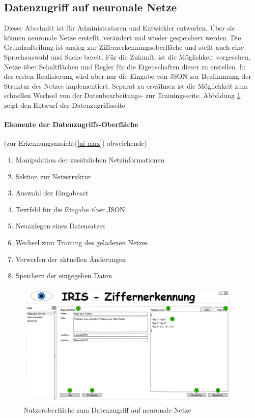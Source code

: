 \subsection{Datenzugriff auf neuronale Netze}
Dieser Abschnitt ist für Administratoren und Entwickler entworfen. Über sie können neuronale Netze erstellt, verändert und wieder gespeichert werden. Die Grundaufteilung ist analog zur Ziffernerkennungsoberfläche und stellt auch eine Sprachauswahl und Suche bereit. Für die Zukunft, ist die Möglichkeit vorgesehen, Netze über Schaltflächen und Regler für die Eigenschaften dieser zu erstellen. In der ersten Realisierung wird aber nur die Eingabe von JSON zur Bestimmung der Struktur des Netzes implementiert. Separat zu erwähnen ist die Möglichkeit zum schnellen Wechsel von der  Datenbearbeitungs- zur Trainingsseite. Abbildung \ref{ui-crud} zeigt den Entwurf der Datenzugriffsseite.

 \paragraph{Elemente der Datenzugriffs-Oberfläche} (zur Erkennungsansicht(\ref{ui-max}) abweichende)
 \begin{enumerate}
 	\item Manipulation der zusätzlichen Netzinformationen
 	\item Sektion zur Netzstruktur
 	\item Auswahl der Eingabeart
 	\item Textfeld für die Eingabe über JSON
 	\item Neuanlegen eines Datensatzes
 	\item Wechsel zum Training des geladenen Netzes
 	\item Verwerfen der aktuellen Änderungen
 	\item Speichern der eingegeben Daten
 \end{enumerate}

\begin{figure}[H]
	\centering
	\includegraphics[width=1\textwidth]{Abbildungen/UI-Mocks/CRUD-Ui.png}
	\caption{Nutzeroberfläche zum Datenzugriff auf neuronale Netze}
	\label{ui-crud}
\end{figure}

